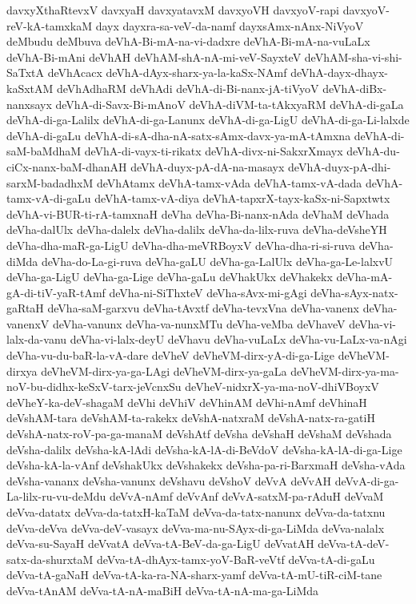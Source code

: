 {davxyXthaRtevxV
davxyaH
davxyatavxM
davxyoVH
davxyoV-rapi
davxyoV-reV-kA-tamxkaM
dayx
dayxra-sa-veV-da-namf
dayxsAmx-nAnx-NiVyoV
deMbudu
deMbuva
deVhA-Bi-mA-na-vi-dadxre
deVhA-Bi-mA-na-vuLaLx
deVhA-Bi-mAni
deVhAH
deVhAM-shA-nA-mi-veV-SayxteV
deVhAM-sha-vi-shi-SaTxtA
deVhAcacx
deVhA-dAyx-sharx-ya-la-kaSx-NAmf
deVhA-dayx-dhayx-kaSxtAM
deVhAdhaRM
deVhAdi
deVhA-di-Bi-nanx-jA-tiVyoV
deVhA-diBx-nanxsayx
deVhA-di-Savx-Bi-mAnoV
deVhA-diVM-ta-tAkxyaRM
deVhA-di-gaLa
deVhA-di-ga-Lalilx
deVhA-di-ga-Lanunx
deVhA-di-ga-LigU
deVhA-di-ga-Li-lalxde
deVhA-di-gaLu
deVhA-di-sA-dha-nA-satx-sAmx-davx-ya-mA-tAmxna
deVhA-di-saM-baMdhaM
deVhA-di-vayx-ti-rikatx
deVhA-divx-ni-SakxrXmayx
deVhA-du-ciCx-nanx-baM-dhanAH
deVhA-duyx-pA-dA-na-masayx
deVhA-duyx-pA-dhi-sarxM-badadhxM
deVhAtamx
deVhA-tamx-vAda
deVhA-tamx-vA-dada
deVhA-tamx-vA-di-gaLu
deVhA-tamx-vA-diya
deVhA-tapxrX-tayx-kaSx-ni-Sapxtwtx
deVhA-vi-BUR-ti-rA-tamxnaH
deVha
deVha-Bi-nanx-nAda
deVhaM
deVhada
deVha-dalUlx
deVha-dalelx
deVha-dalilx
deVha-da-lilx-ruva
deVha-deVsheYH
deVha-dha-maR-ga-LigU
deVha-dha-meVRBoyxV
deVha-dha-ri-si-ruva
deVha-diMda
deVha-do-La-gi-ruva
deVha-gaLU
deVha-ga-LalUlx
deVha-ga-Le-lalxvU
deVha-ga-LigU
deVha-ga-Lige
deVha-gaLu
deVhakUkx
deVhakekx
deVha-mA-gA-di-tiV-yaR-tAmf
deVha-ni-SiThxteV
deVha-sAvx-mi-gAgi
deVha-sAyx-natx-gaRtaH
deVha-saM-garxvu
deVha-tAvxtf
deVha-tevxVna
deVha-vanenx
deVha-vanenxV
deVha-vanunx
deVha-va-nunxMTu
deVha-veMba
deVhaveV
deVha-vi-lalx-da-vanu
deVha-vi-lalx-deyU
deVhavu
deVha-vuLaLx
deVha-vu-LaLx-va-nAgi
deVha-vu-du-baR-la-vA-dare
deVheV
deVheVM-dirx-yA-di-ga-Lige
deVheVM-dirxya
deVheVM-dirx-ya-ga-LAgi
deVheVM-dirx-ya-gaLa
deVheVM-dirx-ya-ma-noV-bu-didhx-keSxV-tarx-jeVcnxSu
deVheV-nidxrX-ya-ma-noV-dhiVBoyxV
deVheY-ka-deV-shagaM
deVhi
deVhiV
deVhinAM
deVhi-nAmf
deVhinaH
deVshAM-tara
deVshAM-ta-rakekx
deVshA-natxraM
deVshA-natx-ra-gatiH
deVshA-natx-roV-pa-ga-manaM
deVshAtf
deVsha
deVshaH
deVshaM
deVshada
deVsha-dalilx
deVsha-kA-lAdi
deVsha-kA-lA-di-BeVdoV
deVsha-kA-lA-di-ga-Lige
deVsha-kA-la-vAnf
deVshakUkx
deVshakekx
deVsha-pa-ri-BarxmaH
deVsha-vAda
deVsha-vananx
deVsha-vanunx
deVshavu
deVshoV
deVvA
deVvAH
deVvA-di-ga-La-lilx-ru-vu-deMdu
deVvA-nAmf
deVvAnf
deVvA-satxM-pa-rAduH
deVvaM
deVva-datatx
deVva-da-tatxH-kaTaM
deVva-da-tatx-nanunx
deVva-da-tatxnu
deVva-deVva
deVva-deV-vasayx
deVva-ma-nu-SAyx-di-ga-LiMda
deVva-nalalx
deVva-su-SayaH
deVvatA
deVva-tA-BeV-da-ga-LigU
deVvatAH
deVva-tA-deV-satx-da-shurxtaM
deVva-tA-dhAyx-tamx-yoV-BaR-veVtf
deVva-tA-di-gaLu
deVva-tA-gaNaH
deVva-tA-ka-ra-NA-sharx-yamf
deVva-tA-mU-tiR-ciM-tane
deVva-tAnAM
deVva-tA-nA-maBiH
deVva-tA-nA-ma-ga-LiMda
}
